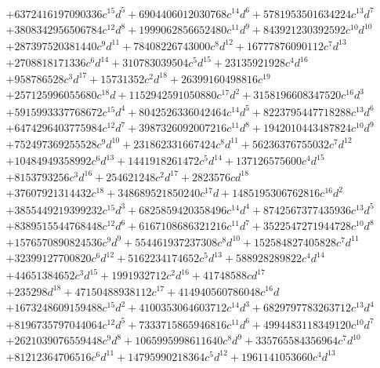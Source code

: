 {\begin{align*}
&+6372416197090336c^{15}d^{5}+6904406012030768c^{14}d^{6}+5781953501634224c^{13}d^{7}\\
&+3808342956506784c^{12}d^{8}+1999062856652480c^{11}d^{9}+843921230392592c^{10}d^{10}\\
&+287397520381440c^{9}d^{11}+78408226743000c^{8}d^{12}+16777876090112c^{7}d^{13}\\
&+2708818171336c^{6}d^{14}+310783039504c^{5}d^{15}+23135921928c^{4}d^{16}\\
&+958786528c^{3}d^{17}+15731352c^{2}d^{18}+26399160498816c^{19}\\
&+257125996055680c^{18}d+1152942591050880c^{17}d^{2}+3158196608347520c^{16}d^{3}\\
&+5915993337768672c^{15}d^{4}+8042526336042464c^{14}d^{5}+8223795447718288c^{13}d^{6}\\
&+6474296403775984c^{12}d^{7}+3987326092007216c^{11}d^{8}+1942010443487824c^{10}d^{9}\\
&+752497369255528c^{9}d^{10}+231862331667424c^{8}d^{11}+56236376755032c^{7}d^{12}\\
&+10484949358992c^{6}d^{13}+1441918261472c^{5}d^{14}+137126575600c^{4}d^{15}\\
&+8153793256c^{3}d^{16}+254621248c^{2}d^{17}+2823576cd^{18}\\
&+37607921314432c^{18}+348689521850240c^{17}d+1485195306762816c^{16}d^{2}\\
&+3855449219399232c^{15}d^{3}+6825859420358496c^{14}d^{4}+8742567377435936c^{13}d^{5}\\
&+8389515544768448c^{12}d^{6}+6167108686321216c^{11}d^{7}+3522547271944728c^{10}d^{8}\\
&+1576570890824536c^{9}d^{9}+554461937237308c^{8}d^{10}+152584827405828c^{7}d^{11}\\
&+32399127700820c^{6}d^{12}+5162234174652c^{5}d^{13}+588928289822c^{4}d^{14}\\
&+44651384652c^{3}d^{15}+1991932712c^{2}d^{16}+41748588cd^{17}\\
&+235298d^{18}+47150488938112c^{17}+414940560786048c^{16}d\\
&+1673248609159488c^{15}d^{2}+4100353064603712c^{14}d^{3}+6829797783263712c^{13}d^{4}\\
&+8196735797044064c^{12}d^{5}+7333715865946816c^{11}d^{6}+4994483118349120c^{10}d^{7}\\
&+2621039076559448c^{9}d^{8}+1065995998611640c^{8}d^{9}+335765584356964c^{7}d^{10}\\
&+81212364706516c^{6}d^{11}+14795990218364c^{5}d^{12}+1961141053660c^{4}d^{13}\\

\end{align*}}
